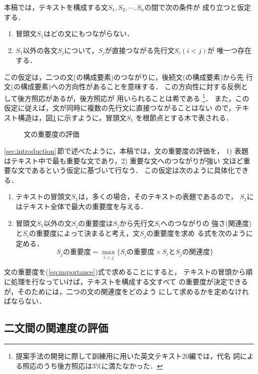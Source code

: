本稿では，テキストを構成する文$S_1,S_2,\cdots,S_n$の間で次の条件が
成り立つと仮定する．
\begin{enumerate}
\item 冒頭文$S_1$はどの文にもつながらない．
\item $S_1$以外の各文$S_j$について，$S_j$が直接つながる先行文$S_i (i<j)$が
唯一つ存在する．
\end{enumerate}
この仮定は，二つの文(の構成要素)のつながりに，後続文(の構成要素)から先
行文(の構成要素)への方向性があることを意味する．
この方向性に対する反例として後方照応\cite{Hirst81}があるが，後方照応が
用いられることは希である
\footnote{提案手法の開発に際して訓練用に用いた英文テキスト20編では，代名
詞による照応のうち後方照応は3\%に満たなかった．}．
また，この仮定に従えば，文が同時に複数の先行文に直接つながることはない
ので，テキスト構造は，図\ref{fig:texttree}\,に示すように，冒頭文$S_1$
を根節点とする木で表される．
\begin{figure}[htbp]
\begin{center}
\end{center}
\caption{文の重要度の評価}
\label{fig:texttree}
\end{figure}

\ref{sec:introduction}\,節で述べたように，本稿では，文の重要度の評価を，
1) 表題はテキスト中で最も重要な文であり，2) 重要な文へのつながりが強い
文ほど重要な文であるという仮定に基づいて行なう．
この仮定は次のように具体化できる．
\begin{enumerate}
\item テキストの冒頭文$S_1$は，多くの場合，そのテキストの表題であるので，
$S_1$にはテキスト全体で最大の重要度を与える．
\item 冒頭文$S_1$以外の文$S_j$の重要度は$S_j$から先行文$S_i$へのつながりの
強さ(関連度)と$S_i$の重要度によって決まると考え，文$S_j$の重要度を求め
る式を次のように定める．
\begin{equation}
S_jの重要度 = \max_{i<j}\{S_iの重要度 \times S_iとS_jの関連度\}
\label{eq:importance}
\end{equation}
\end{enumerate}
文の重要度を(\ref{eq:importance})式で求めることにすると，
テキストの冒頭から順に処理を行なっていけば，テキストを構成する文すべて
の重要度が決定できるが，そのためには，二つの文の関連度をどのよう
にして求めるかを定めなければならない．

\subsection{二文間の関連度の評価}
\label{sec:importance:relevance}

